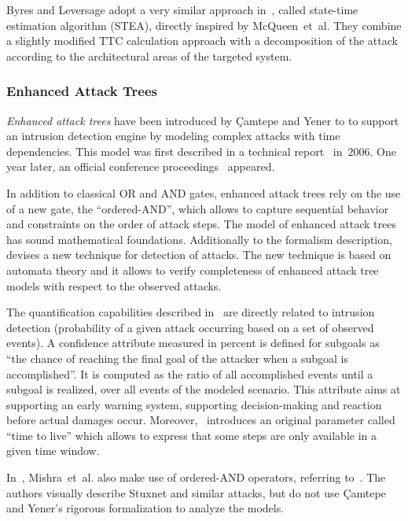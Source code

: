 \documentclass[a4paper]{article}
\begin{document}
Byres and Leversage adopt a very similar approach in~\cite{LeBy,LeBy2}, called
state-time estimation algorithm (STEA), directly inspired by McQueen~et~al.
They combine a slightly modified TTC calculation approach with a decomposition
of the attack according to the architectural areas of the targeted system.

\subsubsection{Enhanced Attack Trees} 
\label{sec:enhanced_attack_trees}

\emph{Enhanced attack trees} have been introduced by \c{C}amtepe and Yener to to
support an intrusion detection engine by modeling complex attacks with time
dependencies.  This model was first described in a technical
report~\cite{Camtepe2006} in~$2006$. One year later, an official conference
proceedings~\cite{CaYe} appeared.

In addition to classical OR and AND gates, enhanced attack trees rely on the use
of a new gate, the ``ordered-AND'', which allows to capture sequential behavior
and constraints on the order of attack steps.  The model of enhanced attack
trees has sound mathematical foundations. Additionally to the formalism
description,~\cite{CaYe} devises  a new technique for detection of attacks.  The
new technique is based  on automata theory and it allows to verify completeness
of  enhanced attack tree models with respect to the observed attacks.

The quantification capabilities described in~\cite{CaYe} are  directly related 
to intrusion detection (probability of a given attack occurring based on a set
of observed events). A confidence attribute measured in percent is defined for
subgoals as ``the chance of reaching the final goal of the attacker when a
subgoal is accomplished''. It is computed as the ratio of all accomplished
events until a subgoal is realized, over all events of the modeled scenario.
This attribute aims at supporting an early warning system, supporting
decision-making and reaction before actual damages occur. Moreover,~\cite{CaYe}
introduces an original parameter  called ``time to live'' which allows to
express that some steps are  only available in a given time window.

In~\cite{MiKaYa}, Mishra~et~al. also make use of ordered-AND operators,
referring to~\cite{CaYe}. The authors visually describe Stuxnet and
similar attacks, but do not use \c{C}amtepe and Yener's rigorous formalization
to analyze the models.
\end{document}
